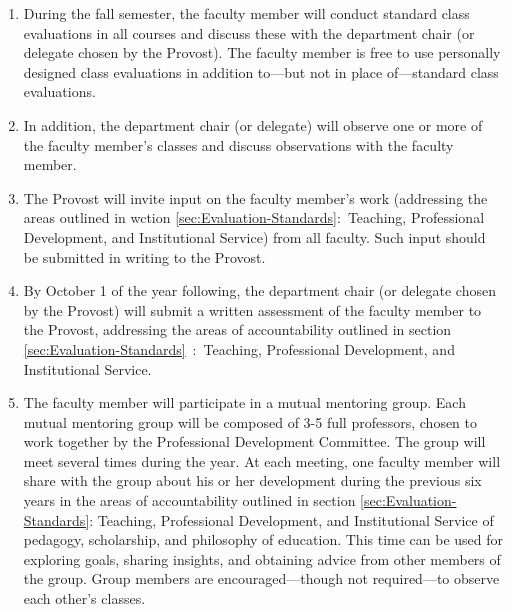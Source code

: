 \begin{enumerate}[label=\alph*)]
{					\begin{enumerate}[label=\arabic*)]

						\item{ During the fall semester, the faculty member will
							conduct standard class evaluations in all courses and
							discuss these with the department chair (or delegate chosen
							by the Provost). The faculty member is free to use
							personally designed class evaluations in addition to---but
							not in place of---standard class evaluations.}

						\item{ In addition, the department chair (or
							delegate) will observe one or more of the faculty
							member's classes and discuss observations with the
							faculty member. }

						\item{ The Provost will invite input on the faculty member's work (addressing
							the areas outlined in
							wction
							\ref{sec:Evaluation-Standards}:~Teaching, Professional Development, and
							Institutional Service) from all faculty. Such input should be submitted in
							writing to the Provost. }

						\item{ By October 1 of the year following, the department chair (or delegate
							chosen by the Provost) will submit a written assessment of the faculty member to
							the Provost, addressing the areas of accountability outlined in
							section
							\ref{sec:Evaluation-Standards}~:~Teaching, Professional Development, and Institutional Service. }

						\item{ The faculty member will participate in a mutual mentoring group. Each
							mutual mentoring group will be composed of 3-5 full professors, chosen to work
							together by the Professional Development Committee. The group will meet several
							times during the year. At each meeting, one faculty member will share with the
							group about his or her development during the previous six years in the areas of
							accountability outlined in
							section
							\ref{sec:Evaluation-Standards}: Teaching, Professional Development,
							and Institutional Service of pedagogy, scholarship, and philosophy of education.
							This time can be used for exploring goals, sharing insights, and obtaining
							advice from other members of the group. Group members are encouraged---though
							not required---to observe each other's classes. }


\end{enumerate}}
\end{enumerate}
